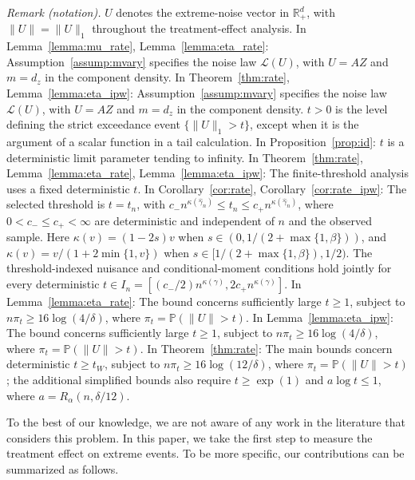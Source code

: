 \documentclass[12pt]{article}
\theoremstyle{plain}
\theoremstyle{definition}
\begin{document}
\noindent\textit{Remark (notation).} $U$ denotes the extreme-noise vector in $\mathbb R_+^d$, with $\|U\|=\|U\|_1$ throughout the treatment-effect analysis. In Lemma~\ref{lemma:mu_rate}, Lemma~\ref{lemma:eta_rate}: Assumption~\ref{assump:mvary} specifies the noise law $\mathcal L(U)$, with $U=AZ$ and $m=d_z$ in the component density. In Theorem~\ref{thm:rate}, Lemma~\ref{lemma:eta_ipw}: Assumption~\ref{assump:mvary} specifies the noise law $\mathcal L(U)$, with $U=AZ$ and $m=d_z$ in the component density. $t>0$ is the level defining the strict exceedance event $\{\|U\|_1>t\}$, except when it is the argument of a scalar function in a tail calculation. In Proposition~\ref{prop:id}: $t$ is a deterministic limit parameter tending to infinity. In Theorem~\ref{thm:rate}, Lemma~\ref{lemma:eta_rate}, Lemma~\ref{lemma:eta_ipw}: The finite-threshold analysis uses a fixed deterministic $t$. In Corollary~\ref{cor:rate}, Corollary~\ref{cor:rate_ipw}: The selected threshold is $t=t_n$, with $c_-n^{\kappa(\hat\gamma_n)}\leq t_n\leq c_+n^{\kappa(\hat\gamma_n)}$, where $0<c_-\leq c_+<\infty$ are deterministic and independent of $n$ and the observed sample. Here $\kappa(v)=(1-2s)v$ when $s\in(0,1/(2+\max\{1,\beta\}))$, and $\kappa(v)=v/(1+2\min\{1,v\})$ when $s\in[1/(2+\max\{1,\beta\}),1/2)$. The threshold-indexed nuisance and conditional-moment conditions hold jointly for every deterministic $t\in I_n=[(c_-/2)n^{\kappa(\gamma)},2c_+n^{\kappa(\gamma)}]$. In Lemma~\ref{lemma:eta_rate}: The bound concerns sufficiently large $t\geq1$, subject to $n\pi_t\geq16\log(4/\delta)$, where $\pi_t=\mathbb P(\|U\|>t)$. In Lemma~\ref{lemma:eta_ipw}: The bound concerns sufficiently large $t\geq1$, subject to $n\pi_t\geq16\log(4/\delta)$, where $\pi_t=\mathbb P(\|U\|>t)$. In Theorem~\ref{thm:rate}: The main bounds concern deterministic $t\geq t_W$, subject to $n\pi_t\geq16\log(12/\delta)$, where $\pi_t=\mathbb P(\|U\|>t)$; the additional simplified bounds also require $t\geq\exp(1)$ and $a\log t\leq1$, where $a=R_\alpha(n,\delta/12)$.


To the best of our knowledge, we are not aware of any work in the literature that considers this problem. In this paper, we take the first step to measure the treatment effect on extreme events. To be more specific, our contributions can be summarized as follows. 
\end{document}
